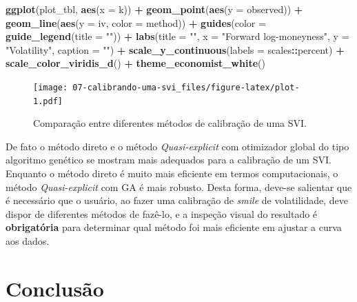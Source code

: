 \documentclass[]{book}
\newenvironment{Shaded}{\begin{snugshade}}{\end{snugshade}}
\newcommand{\DataTypeTok}[1]{\textcolor[rgb]{0.13,0.29,0.53}{#1}}
\newcommand{\KeywordTok}[1]{\textcolor[rgb]{0.13,0.29,0.53}{\textbf{#1}}}
\newcommand{\NormalTok}[1]{#1}
\newcommand{\OperatorTok}[1]{\textcolor[rgb]{0.81,0.36,0.00}{\textbf{#1}}}
\newcommand{\StringTok}[1]{\textcolor[rgb]{0.31,0.60,0.02}{#1}}
\theoremstyle{definition}
\theoremstyle{definition}
\theoremstyle{definition}
\theoremstyle{remark}
\begin{document}
\begin{Shaded}
\begin{Highlighting}[]
\KeywordTok{ggplot}\NormalTok{(plot_tbl, }\KeywordTok{aes}\NormalTok{(}\DataTypeTok{x =}\NormalTok{ k)) }\OperatorTok{+}\StringTok{ }
\StringTok{  }\KeywordTok{geom_point}\NormalTok{(}\KeywordTok{aes}\NormalTok{(}\DataTypeTok{y =}\NormalTok{ observed)) }\OperatorTok{+}
\StringTok{  }\KeywordTok{geom_line}\NormalTok{(}\KeywordTok{aes}\NormalTok{(}\DataTypeTok{y =}\NormalTok{ iv, }\DataTypeTok{color =}\NormalTok{ method)) }\OperatorTok{+}
\StringTok{  }\KeywordTok{guides}\NormalTok{(}\DataTypeTok{color =} \KeywordTok{guide_legend}\NormalTok{(}\DataTypeTok{title =} \StringTok{""}\NormalTok{)) }\OperatorTok{+}
\StringTok{  }\KeywordTok{labs}\NormalTok{(}\DataTypeTok{title =} \StringTok{""}\NormalTok{,}
       \DataTypeTok{x =} \StringTok{"Forward log-moneyness"}\NormalTok{,}
       \DataTypeTok{y =} \StringTok{"Volatility"}\NormalTok{,}
       \DataTypeTok{caption =} \StringTok{""}\NormalTok{) }\OperatorTok{+}
\StringTok{  }\KeywordTok{scale_y_continuous}\NormalTok{(}\DataTypeTok{labels =}\NormalTok{ scales}\OperatorTok{::}\NormalTok{percent) }\OperatorTok{+}
\StringTok{  }\KeywordTok{scale_color_viridis_d}\NormalTok{() }\OperatorTok{+}
\StringTok{  }\KeywordTok{theme_economist_white}\NormalTok{()}
\end{Highlighting}
\end{Shaded}

\begin{figure}
\centering
\texttt{[image: 07-calibrando-uma-svi\_files/figure-latex/plot-1.pdf]}
\caption{\label{fig:plot}Comparação entre diferentes métodos de calibração de uma SVI.}
\end{figure}

De fato o método direto e o método \emph{Quasi-explicit} com otimizador global do tipo algoritmo genético se mostram mais adequados para a calibração de um SVI. Enquanto o método direto é muito mais eficiente em termos computacionais, o método \emph{Quasi-explicit} com GA é mais robusto. Desta forma, deve-se salientar que é necessário que o usuário, ao fazer uma calibração de \emph{smile} de volatilidade, deve dispor de diferentes métodos de fazê-lo, e a inspeção visual do resultado é \textbf{obrigatória} para determinar qual método foi mais eficiente em ajustar a curva aos dados.

\hypertarget{conclusao-3}{%
\section{Conclusão}\label{conclusao-3}}
\end{document}
